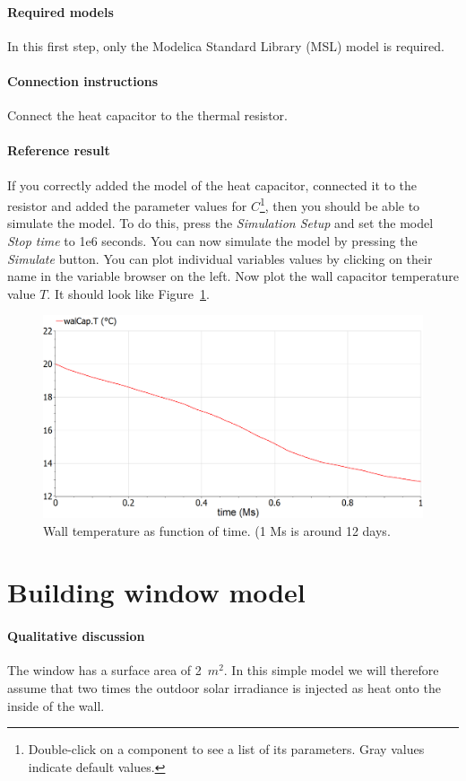 \documentclass[10pt,a4paper]{article}
\begin{document}
\paragraph{Required models}
In this first step, only the Modelica Standard Library (MSL) model  is required.

\paragraph{Connection instructions}
Connect the heat capacitor to the thermal resistor.

\paragraph{Reference result}
If you correctly added the model of the heat capacitor, connected it to the resistor and added the parameter values for $C$\footnote{Double-click on a component to see a list of its parameters. Gray values indicate default values.}, then you should be able to simulate the model. To do this, press the \textit{Simulation Setup} and set the model \textit{Stop time} to 1e6 seconds. You can now simulate the model by pressing the \textit{Simulate} button. You can plot individual variables values by clicking on their name in the variable browser on the left. Now plot the wall capacitor temperature value $T$. It should look like Figure~\ref{fig:res1}.

\begin{figure}[h]
\centering
\includegraphics[width=0.6\columnwidth]{img/result1.png}
\caption{Wall temperature as function of time. (1 Ms is around 12 days.}
\label{fig:res1}
\end{figure}



\newpage
\section{Building window model}
\paragraph{Qualitative discussion}
The window has a surface area of 2~$m^2$. In this simple model we will therefore assume that two times the outdoor solar irradiance is injected as heat onto the inside of the wall.
\end{document}
